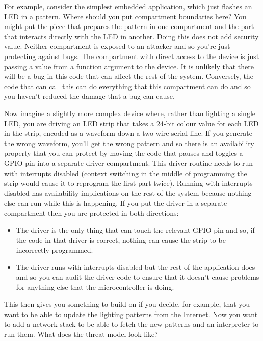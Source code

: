 For example, consider the simplest embedded application, which just flashes an LED in a pattern.
Where should you put compartment boundaries here?
You might put the piece that prepares the pattern in one compartment and the part that interacts directly with the LED in another.
Doing this does not add security value.
Neither compartment is exposed to an attacker and so you're just protecting against bugs.
The compartment with direct access to the device is just passing a value from a function argument to the device.
It is unlikely that there will be a bug in this code that can affect the rest of the system.
Conversely, the code that can call this can do everything that this compartment can do and so you haven't reduced the damage that a bug can cause.

Now imagine a slightly more complex device where, rather than lighting a single LED, you are driving an LED strip that takes a 24-bit colour value for each LED in the strip, encoded as a waveform down a two-wire serial line.
If you generate the wrong waveform, you'll get the wrong pattern and so there is an availability property that you can protect by moving the code that pauses and toggles a GPIO pin into a separate driver compartment.
This driver routine needs to run with interrupts disabled (context switching in the middle of programming the strip would cause it to reprogram the first part twice).
Running with interrupts disabled has availability implications on the rest of the system because nothing else can run while this is happening.
If you put the driver in a separate compartment then you are protected in both directions:

\begin{itemize}
	\item{The driver is the only thing that can touch the relevant GPIO pin and so, if the code in that driver is correct, nothing can cause the strip to be incorrectly programmed.}
	\item{The driver runs with interrupts disabled but the rest of the application does and so you can audit the driver code to ensure that it doesn't cause problems for anything else that the microcontroller is doing.}
\end{itemize}

This then gives you something to build on if you decide, for example, that you want to be able to update the lighting patterns from the Internet.
Now you want to add a network stack to be able to fetch the new patterns and an interpreter to run them.
What does the threat model look like?

